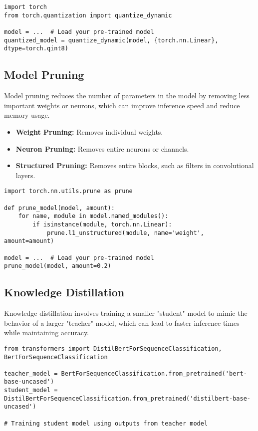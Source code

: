 \begin{verbatim}
import torch
from torch.quantization import quantize_dynamic

model = ...  # Load your pre-trained model
quantized_model = quantize_dynamic(model, {torch.nn.Linear}, dtype=torch.qint8)
\end{verbatim}

\subsection{Model Pruning}
Model pruning reduces the number of parameters in the model by removing less important weights or neurons, which can improve inference speed and reduce memory usage.

\begin{itemize}
    \item \textbf{Weight Pruning:} Removes individual weights.
    \item \textbf{Neuron Pruning:} Removes entire neurons or channels.
    \item \textbf{Structured Pruning:} Removes entire blocks, such as filters in convolutional layers.
\end{itemize}

\begin{verbatim}
import torch.nn.utils.prune as prune

def prune_model(model, amount):
    for name, module in model.named_modules():
        if isinstance(module, torch.nn.Linear):
            prune.l1_unstructured(module, name='weight', amount=amount)

model = ...  # Load your pre-trained model
prune_model(model, amount=0.2)
\end{verbatim}

\subsection{Knowledge Distillation}
Knowledge distillation involves training a smaller "student" model to mimic the behavior of a larger "teacher" model, which can lead to faster inference times while maintaining accuracy.

\begin{verbatim}
from transformers import DistilBertForSequenceClassification, BertForSequenceClassification

teacher_model = BertForSequenceClassification.from_pretrained('bert-base-uncased')
student_model = DistilBertForSequenceClassification.from_pretrained('distilbert-base-uncased')

# Training student model using outputs from teacher model
\end{verbatim}

